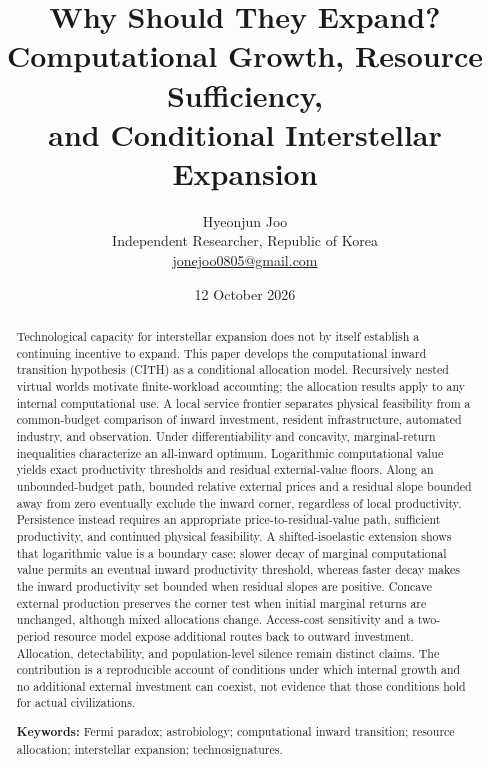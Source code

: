 \documentclass[11pt,a4paper]{article}
\title{Why Should They Expand?\\[3pt]\large Computational Growth, Resource Sufficiency,\\and Conditional Interstellar Expansion}
\author{Hyeonjun Joo\\[3pt]\normalsize Independent Researcher, Republic of Korea\\\normalsize\href{mailto:jonejoo0805@gmail.com}{jonejoo0805@gmail.com}}
\date{12 October 2026}
\theoremstyle{definition}\newtheorem{definition}{Definition}
\begin{document}
\maketitle
\begin{abstract}
Technological capacity for interstellar expansion does not by itself establish a continuing incentive to expand. This paper develops the computational inward transition hypothesis (CITH) as a conditional allocation model. Recursively nested virtual worlds motivate finite-workload accounting; the allocation results apply to any internal computational use. A local service frontier separates physical feasibility from a common-budget comparison of inward investment, resident infrastructure, automated industry, and observation. Under differentiability and concavity, marginal-return inequalities characterize an all-inward optimum. Logarithmic computational value yields exact productivity thresholds and residual external-value floors. Along an unbounded-budget path, bounded relative external prices and a residual slope bounded away from zero eventually exclude the inward corner, regardless of local productivity. Persistence instead requires an appropriate price-to-residual-value path, sufficient productivity, and continued physical feasibility. A shifted-isoelastic extension shows that logarithmic value is a boundary case: slower decay of marginal computational value permits an eventual inward productivity threshold, whereas faster decay makes the inward productivity set bounded when residual slopes are positive. Concave external production preserves the corner test when initial marginal returns are unchanged, although mixed allocations change. Access-cost sensitivity and a two-period resource model expose additional routes back to outward investment. Allocation, detectability, and population-level silence remain distinct claims. The contribution is a reproducible account of conditions under which internal growth and no additional external investment can coexist, not evidence that those conditions hold for actual civilizations.
\par\smallskip\noindent\textbf{Keywords:} Fermi paradox; astrobiology; computational inward transition; resource allocation; interstellar expansion; technosignatures.

\end{abstract}
\ifdefined\reviewmode\linenumbers\fi



\end{document}
